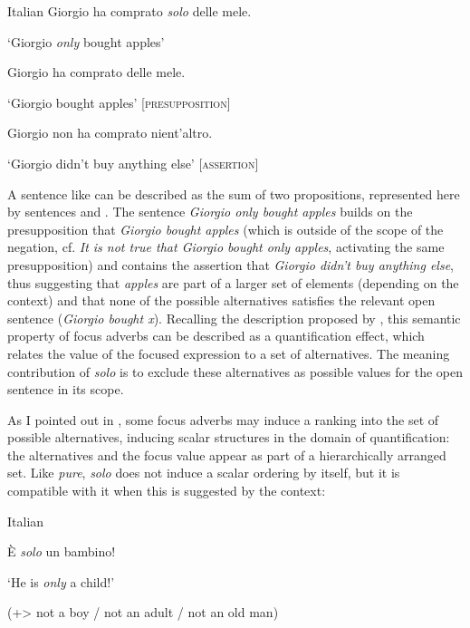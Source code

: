 \ea%
    \label{ex:key:88}

           Italian
\ea \label{ex:key:88a} Giorgio ha comprato \textit{solo} delle mele.

\glt ‘Giorgio \textit{only} bought apples’

\ex \label{ex:key:88b} Giorgio ha comprato delle mele.

\glt ‘Giorgio bought apples’      [\textsc{presupposition}]

\ex\label{ex:key:88c} Giorgio non ha comprato nient’altro.

\glt ‘Giorgio didn’t buy anything else’   [\textsc{assertion}]
    \z
\z

A sentence like  can be described as the sum of two propositions, represented here by sentences  and . The sentence \textit{Giorgio only bought apples} builds on the presupposition that \textit{Giorgio bought apples} (which is outside of the scope of the negation, cf. \textit{It is not true that Giorgio bought only apples}, activating the same presupposition) and contains the assertion that \textit{Giorgio didn’t buy anything else}, thus suggesting that \textit{apples} are part of a larger set of elements (depending on the context) and that none of the possible alternatives satisfies the relevant open sentence (\textit{Giorgio bought x}). Recalling the description proposed by \citet[94--119]{König1991}, this semantic property of focus adverbs can be described as a quantification effect, which relates the value of the focused expression to a set of alternatives. The meaning contribution of \textit{solo} is to exclude these alternatives as possible values for the open sentence in its scope.

As I pointed out in , some focus adverbs may induce a ranking into the set of possible alternatives, inducing scalar structures in the domain of quantification: the alternatives and the focus value appear as part of a hierarchically arranged set. Like \textit{pure}, \textit{solo} does not induce a scalar ordering by itself, but it is compatible with it when this is suggested by the context:

\ea%
    \label{ex:key:89}

           Italian

È \textit{solo} un bambino!

\glt ‘He is \textit{only} a child!’

(+> not a boy / not an adult / not an old man)
    \z %

